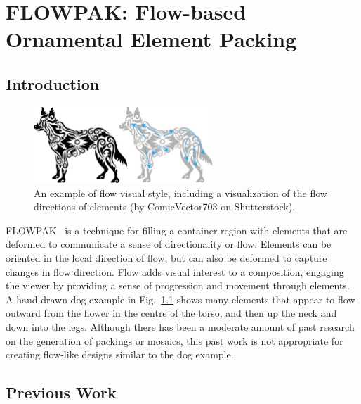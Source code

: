 \chapter
{FLOWPAK: Flow-based Ornamental Element Packing}



\section{Introduction}

\begin{figure}[ht] %
\centering
\includegraphics[width=0.6\textwidth]{figures/flowpak/dog_ornament_flow.pdf}
\vspace*{-8pt}
\caption[An example of flow visual style]{
  \label{dog_flow}  
  An example of flow visual style, 
  including a visualization of the flow directions
of elements (by ComicVector703 on Shutterstock).
}
\end{figure}

FLOWPAK~\cite{Saputra2017} is a technique for filling a container 
region with elements that are deformed 
to communicate a sense of directionality or flow.
Elements can be oriented in the local direction 
of flow, but can also be deformed to capture changes in flow direction.
Flow adds visual interest to a composition,
engaging the viewer by providing a sense of progression and
movement through elements.
A hand-drawn dog example in Fig.~\ref{dog_flow} shows many elements that appear to flow
outward from the flower in the centre of the torso, and then
up the neck and down into the legs.
Although there has been a moderate amount of past research on
the generation of packings or mosaics,
this past work is not appropriate for creating flow-like
designs similar to the dog example.


\section{Previous Work}


